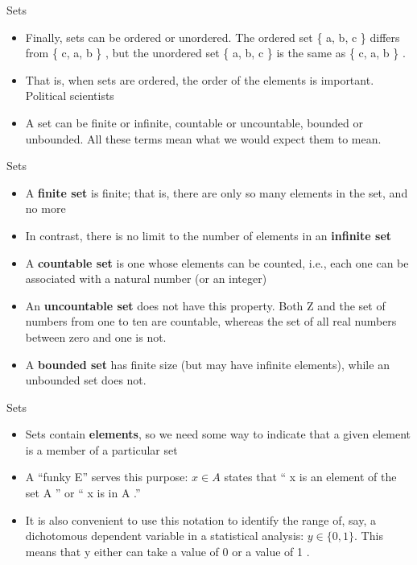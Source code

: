 \documentclass[
  ignorenonframetext,
]{beamer}
\begin{document}
\begin{frame}{Sets}
\protect\hypertarget{sets-3}{}

\begin{itemize}
\item
  Finally, sets can be ordered or unordered. The ordered set \{ a, b, c
  \} differs from \{ c, a, b \} , but the unordered set \{ a, b, c \} is
  the same as \{ c, a, b \} .
\item
  That is, when sets are ordered, the order of the elements is
  important. Political scientists
\item
  A set can be finite or infinite, countable or uncountable, bounded or
  unbounded. All these terms mean what we would expect them to mean.
\end{itemize}

\end{frame}

\begin{frame}{Sets}
\protect\hypertarget{sets-4}{}

\begin{itemize}
\item
  A \textbf{finite set} is finite; that is, there are only so many
  elements in the set, and no more
\item
  In contrast, there is no limit to the number of elements in an
  \textbf{infinite set}
\item
  A \textbf{countable set} is one whose elements can be counted, i.e.,
  each one can be associated with a natural number (or an integer)
\item
  An \textbf{uncountable set} does not have this property. Both Z and
  the set of numbers from one to ten are countable, whereas the set of
  all real numbers between zero and one is not.
\item
  A \textbf{bounded set} has finite size (but may have infinite
  elements), while an unbounded set does not.
\end{itemize}

\end{frame}

\begin{frame}{Sets}
\protect\hypertarget{sets-5}{}

\begin{itemize}
\item
  Sets contain \textbf{elements}, so we need some way to indicate that a
  given element is a member of a particular set
\item
  A ``funky E'' serves this purpose: \(x \in A\) states that `` x is an
  element of the set A '' or `` x is in A .''
\item
  It is also convenient to use this notation to identify the range of,
  say, a dichotomous dependent variable in a statistical analysis:
  \(y \in \{0 , 1\}\). This means that y either can take a value of 0 or
  a value of 1 .
\end{itemize}

\end{frame}
\end{document}

